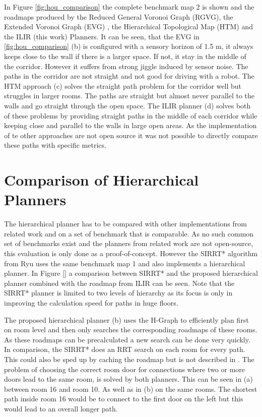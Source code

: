 In Figure \ref{fig:hou_comparison} the complete benchmark map 2 is shown and the roadmaps produced by the Reduced General Voronoi Graph (RGVG), the  Extended Voronoi Graph (EVG) \cite{beeson_towards_2005}, the Hierarchical Topological Map (HTM) \cite{hou_straight_2021} and the ILIR (this work) Planners. It can be seen, that the EVG in \ref{fig:hou_comparison} (b) is configured with a sensory horizon of 1.5 m, it always keeps close to the wall if there is a larger space. If not, it stay in the middle of the corridor. However it suffers from strong jiggle induced by sensor noise. The paths in the corridor are not straight and not good for driving with a robot. The HTM approach (c) solves the straight path problem for the corridor well but struggles in larger rooms. The paths are straight but almost never parallel to the walls and go straight through the open space. The ILIR planner (d) solves both of these problems by providing straight paths in the middle of each corridor while keeping close and parallel to the walls in large open areas. As the implementation of te other approaches are not open source it was not possible to directly compare these paths with specific metrics.

\section{Comparison of Hierarchical Planners}
\label{sec:evaluation_hierarchical}
The hierarchical planner has to be compared with other implementations from related work and on a set of benchmark that is comparable. As no such common set of benchmarks exist and the planners from related work are not open-source, this evaluation is only done as a proof-of-concept. However the SIRRT* algorithm from Ryu \cite{ryu_hierarchical_2020} uses the same benchmark map 1 and also implements a hierarchical planner. In Figure \ref{} a comparison between SIRRT* and the proposed hierarchical planner combined with the roadmap from ILIR can be seen. Note that the SIRRT* planner is limited to two levels of hierarchy as its focus is only in improving the calculation speed for paths in huge floors. 


The proposed hierarchical planner (b) uses the H-Graph to efficiently plan first on room level and then only searches the corresponding roadmaps of these rooms. As these roadmaps can be precalculated a new search can be done very quickly. In comparison, the SIRRT* does an RRT search on each room for every path. This could also be sped up by caching the roadmap but is not described in \cite{ryu_hierarchical_2020}. The problem of choosing the correct room door for connections where two or more doors lead to the same room, is solved by both planners. This can be seen in (a) between room 16 and room 10. As well as in (b) on the same rooms. The shortest path inside room 16 would be to connect to the first door on the left but this would lead to an overall longer path. 

